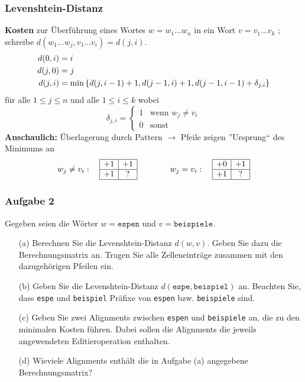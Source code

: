\documentclass{beamer}
\begin{document}
\begin{frame} \frametitle{Levenshtein-Distanz}
	\textbf{Kosten} zur Überführung eines Wortes $w = w_1 \dots w_n$ in ein Wort $v = v_1 \dots v_k$ ; schreibe $d(w_1 \dots w_j, v_1 \dots v_i) = d(j,i)$.
	\pause
	\begin{align*}
		d(0,i) &= i \\
		d(j,0) &= j \\
		d(j,i) &= \min \left\{  d(j,i-1) + 1, d(j-1,i) + 1 , d(j-1, i-1) + \delta_{j,i} \right\}
	\end{align*}
	für alle $1 \le j \le n$ und alle $1 \le i \le k$ wobei
	\begin{equation*}
		\delta_{j,i} = \begin{cases}
		1 & \text{wenn } w_j \neq v_i \\
		0 & \text{sonst}
		\end{cases} 
	\end{equation*}
	\pause
	\textbf{Anschaulich:} 
	Überlagerung durch Pattern
	$\to$ Pfeile zeigen ''Ursprung`` des Minimums an
	\begin{equation*}
		w_j \neq v_i : \quad \begin{array}{|c|c|}
			\hline +1 & +1 \\ \hline +1 & ? \\ \hline
		\end{array}
		\qquad \qquad
		w_j = v_i : \quad 
		\begin{array}{|c|c|}
		\hline +0 & +1 \\ \hline +1 & ? \\ \hline
		\end{array}
	\end{equation*}
\end{frame}

\begin{frame} \frametitle{Aufgabe 2}
	Gegeben seien die Wörter $w = \texttt{espen}$ und $v = \texttt{beispiele}$.
	\begin{itemize}
		\item[(a)] Berechnen Sie die Levenshtein-Distanz $d(w,v)$. Geben Sie dazu die Berechnungsmatrix an. Tragen Sie alle Zelleneinträge zusammen mit den dazugehörigen Pfeilen ein.
		\item[(b)] Geben Sie die Levenshtein-Distanz $d(\texttt{espe},\texttt{beispiel})$ an. Beachten Sie, dass \texttt{espe} und \texttt{beispiel} Präfixe von \texttt{espen} bzw. \texttt{beispiele} sind.
		\item[(c)] Geben Sie zwei Alignments zwischen \texttt{espen} und \texttt{beispiele} an, die zu den minimalen Kosten führen. Dabei sollen die Alignments die jeweils angewendeten Editieroperation enthalten.
		\item[(d)] Wieviele Alignments enthält die in Aufgabe (a) angegebene Berechnungsmatrix?
	\end{itemize}
\end{frame}
\end{document}
